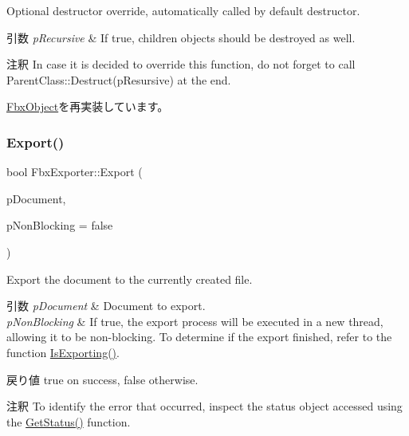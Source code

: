 Optional destructor override, automatically called by default destructor. 
\begin{DoxyParams}{引数}
{\em p\+Recursive} & If true, children objects should be destroyed as well. \\
\hline
\end{DoxyParams}
\begin{DoxyRemark}{注釈}
In case it is decided to override this function, do not forget to call Parent\+Class\+::\+Destruct(p\+Resursive) at the end. 
\end{DoxyRemark}


\hyperlink{class_fbx_object_a123e084d9b32b29c28af6384b7c3c608}{Fbx\+Object}を再実装しています。

\mbox{\label{class_fbx_exporter_a8a92372cf76fe3486a798c87973cc791}} 
\subsubsection{\texorpdfstring{Export()}{Export()}\hspace{0.1cm}{\footnotesize\ttfamily [1/2]}}
{\footnotesize\ttfamily bool Fbx\+Exporter\+::\+Export (\begin{DoxyParamCaption}\item[{\hyperlink{class_fbx_document}{Fbx\+Document} $\ast$}]{p\+Document,  }\item[{bool}]{p\+Non\+Blocking = {\ttfamily false} }\end{DoxyParamCaption})}

Export the document to the currently created file. 
\begin{DoxyParams}{引数}
{\em p\+Document} & Document to export. \\
\hline
{\em p\+Non\+Blocking} & If true, the export process will be executed in a new thread, allowing it to be non-\/blocking. To determine if the export finished, refer to the function \hyperlink{class_fbx_exporter_a244daae57da4509caa361160f0ae3e23}{Is\+Exporting()}. \\
\hline
\end{DoxyParams}
\begin{DoxyReturn}{戻り値}
{\ttfamily true} on success, {\ttfamily false} otherwise. 
\end{DoxyReturn}
\begin{DoxyRemark}{注釈}
To identify the error that occurred, inspect the status object accessed using the \hyperlink{class_fbx_i_o_base_a078e47a99b119278ca3ee639e2da5b6d}{Get\+Status()} function. 
\end{DoxyRemark}
\mbox{\label{class_fbx_exporter_ae14616d7e29cd9ae52cd6bbccd6d6988}} 
